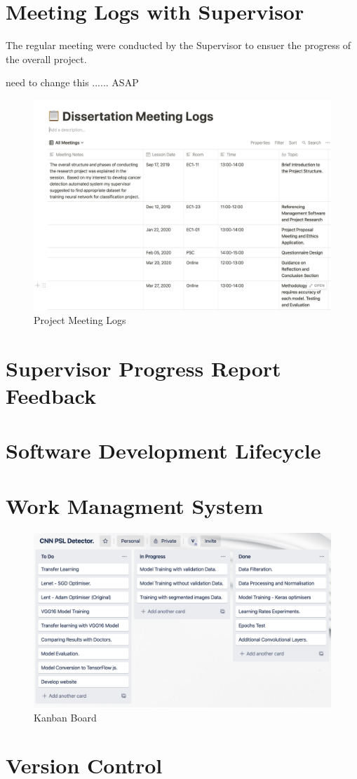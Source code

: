 \section{Meeting Logs with Supervisor}


The regular meeting were conducted by the Supervisor to ensuer the 
progress of the overall project.

need to change this ...... ASAP
\begin{figure}[!htp]
    \centering
    \includegraphics[width=15cm]{Images/meetingLogs.png}
    \caption{Project Meeting Logs}
    \label{codePRO}
\end{figure}




\pagebreak

\section{Supervisor Progress Report Feedback}
\pagebreak
\section{Software Development Lifecycle}
\pagebreak
\section{Work Managment System}
\begin{figure}[!htp]
    \centering
    \includegraphics[width=15cm]{Images/Kanban Bords.png}
    \caption{Kanban Board}
\end{figure}
\pagebreak
\section{Version Control}



